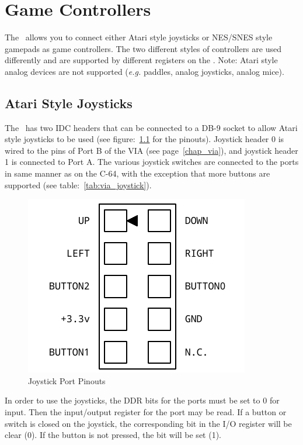 \chapter{Game Controllers}

The \jr\ allows you to connect either Atari style joysticks or NES/SNES style gamepads as game controllers. The two different styles of controllers are used differently and are supported by different registers on the \jr. Note: Atari style analog devices are not supported ({\it e.g.} paddles, analog joysticks, analog mice).

\section*{Atari Style Joysticks}

The \jr\ has two IDC headers that can be connected to a DB-9 socket to allow Atari style joysticks to be used (see figure:~\ref{fig:joystick_ports} for the pinouts). Joystick header 0 is wired to the pins of Port B of the VIA (see page~\ref{chap_via}), and joystick header 1 is connected to Port A. The various joystick switches are connected to the ports in same manner as on the C-64, with the exception that more buttons are supported (see table:~\ref{tab:via_joystick}).

\begin{figure}[ht]
    \begin{center}
        \includegraphics[scale=0.65]{images/f256_port_joystick.pdf}
    \end{center}
    \caption{Joystick Port Pinouts}
    \label{fig:joystick_ports}
\end{figure}

In order to use the joysticks, the DDR bits for the ports must be set to 0 for input. Then the input/output register for the port may be read. If a button or switch is closed on the joystick, the corresponding bit in the I/O register will be clear (0). If the button is not pressed, the bit will be set (1).

